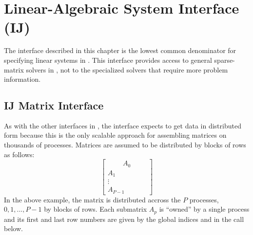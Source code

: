 
\chapter{Linear-Algebraic System Interface (IJ)}
\label{ch-IJ}

The  interface described in this chapter is the lowest common
denominator for specifying linear systems in \hypre{}.  This interface
provides access to general sparse-matrix solvers in \hypre{}, not
to the specialized solvers that require more problem information.


\section{IJ Matrix Interface}

As with the other interfaces in \hypre{}, the  interface
expects to get data in distributed form because this is the only
scalable approach for assembling matrices on thousands of processes.
Matrices are assumed to be distributed by blocks of rows as follows:
\begin{equation}
\left[
\begin{array}{c}
~~~~~~~~~~ A_0 ~~~~~~~~~~ \\
A_1 \\
\vdots \\
A_{P-1}
\end{array}
\right]
\end{equation}
In the above example, the matrix is distributed accross the $P$
processes, $0, 1, ..., P-1$ by blocks of rows.  Each submatrix $A_p$
is ``owned'' by a single process and its first and last row numbers
are given by the global indices  and  in the
 call below.

